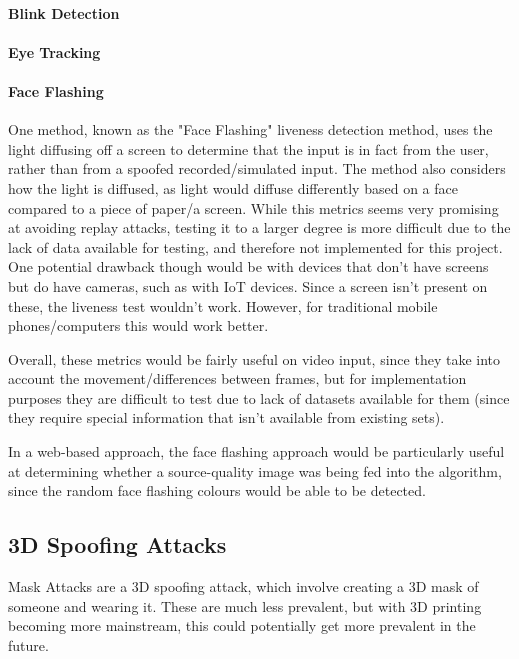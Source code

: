 \documentclass[10pt,a4paper]{article}
\begin{document}
        \paragraph{Blink Detection}

        \paragraph{Eye Tracking}


        \paragraph{Face Flashing}
        One method, known as the "Face Flashing" liveness detection method, uses the light diffusing off a screen to determine that the input is in fact from the user, rather than from a spoofed recorded/simulated input.
        The method also considers how the light is diffused, as light would diffuse differently based on a face compared to a piece of paper/a screen. \cite{LivenessTestFaceFlashing}
        While this metrics seems very promising at avoiding replay attacks, testing it to a larger degree is more difficult due to the lack of data available for testing, and therefore not implemented for this project.
        One potential drawback though would be with devices that don't have screens but do have cameras, such as with IoT devices. Since a screen isn't present on these, the liveness test wouldn't work. However, for traditional mobile phones/computers
        this would work better.

        Overall, these metrics would be fairly useful on video input, since they take into account the movement/differences between frames, but for implementation purposes they are difficult to test due to lack of datasets available for them
        (since they require special information that isn't available from existing sets). 

        In a web-based approach, the face flashing approach would be particularly useful at determining whether a source-quality image was being fed into the algorithm, since the random face flashing colours would be able to be detected.
        
    \subsection{3D Spoofing Attacks}
        Mask Attacks are a 3D spoofing attack, which involve creating a 3D mask of someone and wearing it. \cite{FaceSpoofingAttacksStudy} These are much less prevalent, but with 3D printing becoming more mainstream, this
        could potentially get more prevalent in the future.
\end{document}
